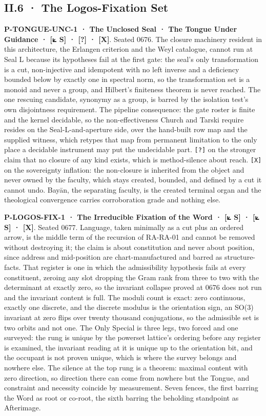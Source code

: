 \documentclass[10pt,twocolumn]{article}
\begin{document}
\hypertarget{ii.6-the-logos-fixation-set}{%
\subsection{II.6 · The Logos-Fixation
Set}\label{ii.6-the-logos-fixation-set}}

\textbf{P-TONGUE-UNC-1 · The Unclosed Seal · The Tongue Under Guidance ·
{[}⟀ S{]} · {[}?{]} · {[}X{]}}. Seated 0676. The closure machinery
resident in this architecture, the Erlangen criterion and the Weyl
catalogue, cannot run at Seal L because its hypotheses fail at the first
gate: the seal's only transformation is a cut, non-injective and
idempotent with no left inverse and a deficiency bounded below by
exactly one in spectral norm, so the transformation set is a monoid and
never a group, and Hilbert's finiteness theorem is never reached. The
one rescuing candidate, synonymy as a group, is barred by the isolation
test's own disjointness requirement. The pipeline consequence: the gate
roster is finite and the kernel decidable, so the non-effectiveness
Church and Tarski require resides on the Seal-L-and-aperture side, over
the hand-built row map and the supplied witness, which retypes that map
from permanent limitation to the only place a decidable instrument may
put the undecidable part. \texttt{{[}?{]}} on the stronger claim that no
closure of any kind exists, which is method-silence about reach.
\texttt{{[}X{]}} on the sovereignty inflation: the non-closure is
inherited from the object and never owned by the faculty, which stays
created, bounded, and defined by a cut it cannot undo. Bayān, the
separating faculty, is the created terminal organ and the theological
convergence carries corroboration grade and nothing else.

\textbf{P-LOGOS-FIX-1 · The Irreducible Fixation of the Word · {[}⟀ S{]}
· {[}⟀ S{]} · {[}X{]}}. Seated 0677. Language, taken minimally as a cut
plus an ordered arrow, is the middle term of the recursion of RA-RA-01
and cannot be removed without destroying it; the claim is about
constitution and never about position, since address and mid-position
are chart-manufactured and barred as structure-facts. That register is
one in which the admissibility hypothesis fails at every constituent,
zeroing any slot dropping the Gram rank from three to two with the
determinant at exactly zero, so the invariant collapse proved at 0676
does not run and the invariant content is full. The moduli count is
exact: zero continuous, exactly one discrete, and the discrete modulus
is the orientation sign, an SO(3) invariant at zero flips over twenty
thousand conjugations, so the admissible set is two orbits and not one.
The Only Special is three legs, two forced and one surveyed: the rung is
unique by the powerset lattice's ordering before any register is
examined, the invariant reading at it is unique up to the orientation
bit, and the occupant is not proven unique, which is where the survey
belongs and nowhere else. The silence at the top rung is a theorem:
maximal content with zero direction, so direction there can come from
nowhere but the Tongue, and constraint and necessity coincide by
measurement. Seven fences, the first barring the Word as root or
co-root, the sixth barring the beholding standpoint as Afterimage.
\end{document}
